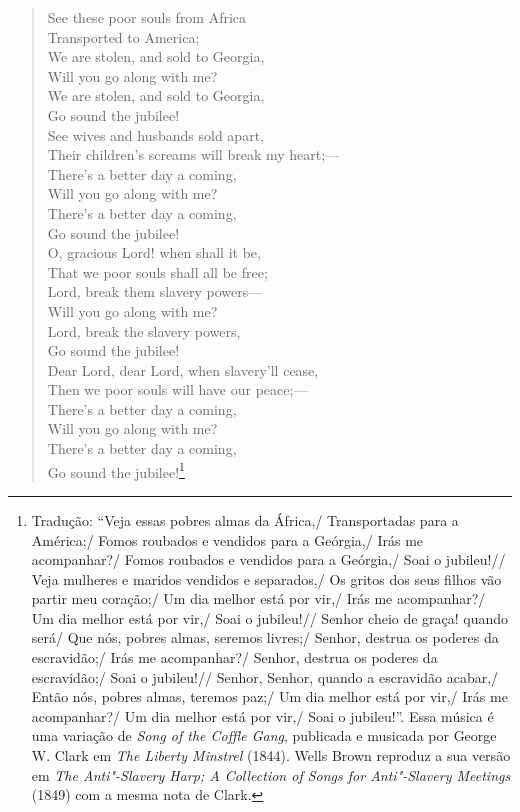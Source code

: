 \begin{verse}
See these poor souls from Africa\\
Transported to America;\\
We are stolen, and sold to Georgia,\\
Will you go along with me?\\
We are stolen, and sold to Georgia,\\
Go sound the jubilee!\\[5pt]

See wives and husbands sold apart,\\
Their children's screams will break my \qb{}heart;---\\
There's a better day a coming,\\
Will you go along with me?\\
There's a better day a coming,\\
Go sound the jubilee!\\[5pt]

O, gracious Lord! when shall it be,\\
That we poor souls shall all be free;\\
Lord, break them slavery powers---\\
Will you go along with me?\\
Lord, break the slavery powers,\\
Go sound the jubilee!\\[5pt]

Dear Lord, dear Lord, when slavery'll cease,\\
Then we poor souls will have our peace;---\\
There's a better day a coming,\\
Will you go along with me?\\
There's a better day a coming,\\
Go sound the jubilee!\footnote{Tradução: ``Veja essas pobres almas da África,/ Transportadas para a América;/ Fomos roubados e vendidos para a Geórgia,/ Irás me acompanhar?/ Fomos roubados e vendidos para a Geórgia,/ Soai o jubileu!//
Veja mulheres e maridos vendidos e separados,/ Os gritos dos seus filhos vão partir meu coração;/
Um dia melhor está por vir,/ Irás me acompanhar?/ Um dia melhor está por vir,/ Soai o jubileu!//
Senhor cheio de graça! quando será/ Que nós, pobres almas, seremos livres;/ Senhor, destrua os poderes da escravidão;/ Irás me acompanhar?/ Senhor, destrua os poderes da escravidão;/ Soai o jubileu!// Senhor, Senhor, quando a escravidão acabar,/ Então nós, pobres almas, teremos paz;/ 
Um dia melhor está por vir,/ Irás me acompanhar?/ Um dia melhor está por vir,/ Soai o jubileu!''. Essa música é uma variação de \emph{Song of the Coffle Gang}, publicada e musicada por
  George W. Clark em \emph{The Liberty Minstrel} (1844). Wells Brown
  reproduz a sua versão em \emph{The Anti"-Slavery Harp; A Collection of
  Songs for Anti"-Slavery Meetings} (1849) com a mesma nota de Clark.}
\end{verse}

